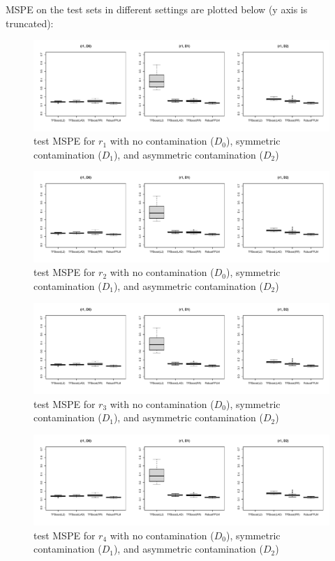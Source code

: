 MSPE on the test sets in different settings are plotted below (y axis is truncated):

\begin{figure}[H]
\centering
\includegraphics[scale = 0.56, page = 1]{figs/sim.pdf}
\caption{test MSPE for $r_1$ with no contamination ($D_0$), symmetric contamination ($D_1$), and asymmetric contamination ($D_2$)}
\end{figure}


\begin{figure}[H]
\centering
\includegraphics[scale = 0.56, page = 2]{figs/sim.pdf}
\caption{test MSPE for $r_2$  with no contamination ($D_0$), symmetric contamination ($D_1$), and asymmetric contamination ($D_2$)}
\end{figure}


\begin{figure}[H]
\centering
\includegraphics[scale = 0.56, page = 3 ]{figs/sim.pdf}
\caption{test MSPE for $r_3$  with no contamination ($D_0$), symmetric contamination ($D_1$), and asymmetric contamination ($D_2$)}
\end{figure}


\begin{figure}[H]
\centering
\includegraphics[scale = 0.56, page = 4]{figs/sim.pdf}
\caption{test MSPE for $r_4$  with no contamination ($D_0$), symmetric contamination ($D_1$), and asymmetric contamination ($D_2$)}
\end{figure}





 